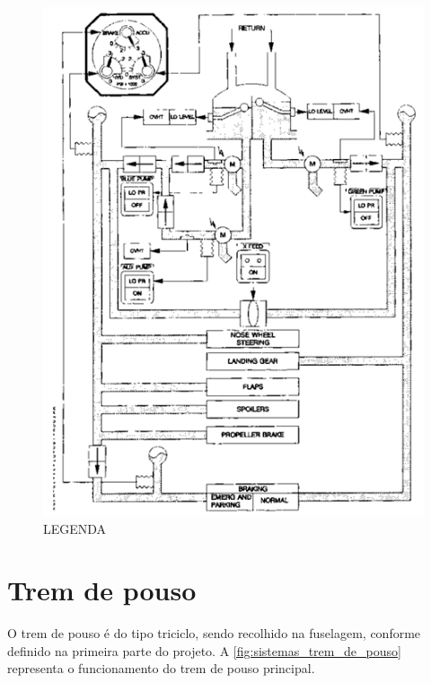 \begin{figure}
\includegraphics[width=\textwidth]{images/parte3/sistemas_hidraulico.png}
\caption{LEGENDA}
\label{fig:sistemas_hidraulico}
\end{figure}


\section{Trem de pouso}

O trem de pouso é do tipo triciclo, sendo recolhido na fuselagem, conforme definido na primeira parte do projeto.
A \autoref{fig:sistemas_trem_de_pouso} representa o funcionamento do trem de pouso principal.

